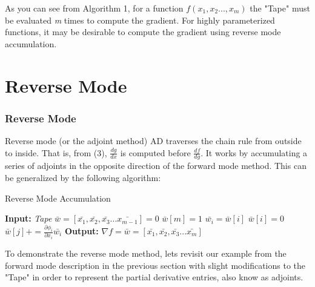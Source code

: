 \documentclass[oneside]{article}
\begin{document}
As you can see from Algorithm 1, for a function $f(x_1,x_2..., x_m)$ the "Tape" must be evaluated \textit{m} times to compute the gradient. For highly parameterized functions, it may be desirable to compute the gradient using reverse mode accumulation.


\section{Reverse Mode}
\subsubsection{Reverse Mode}
Reverse mode (or the adjoint method) AD traverses the chain rule from outside to inside. That is, from (3),  \textit{$\frac{dg}{dx}$} is computed before \textit{$\frac{df}{dg}$}. It works by accumulating a series of adjoints in the opposite direction of the forward mode method. This can be generalized by the following algorithm:
\begin{algorithm*}
  \caption{Reverse Mode Accumulation \cite{griewank2}}
  \begin{algorithmic}[1]
\State \textbf{Input:} \textit{Tape} 
\State $\bar{w} = [\bar{ x_1},\bar{x_2},\bar{x_3}...\bar{x_{m-1}}] = 0$ 
\State $\bar{w}[m] = 1$
\State $\bar{w_i}=\bar{w}[i]$
\State $\bar{w}[i] = 0$
\State $\bar{w}[j] +=  \frac{\partial \phi_i}{\partial x_i}\bar{w_i}$
\EndFor
\EndFor
\State \textbf{Output:} $\nabla f = \bar{w} =  [\bar{ x_1},\bar{x_2},\bar{x_3}...\bar{x_{m}}]$
\end{algorithmic}
 \end{algorithm*}
 
To demonstrate the reverse mode method, lets revisit our example from the forward mode description in the previous section with slight modifications to the "Tape" in order to represent the partial derivative entries, also know as adjoints. \\
\end{document}
